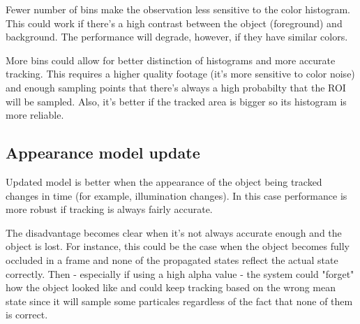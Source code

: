 \documentclass[10pt,a4paper,twoside]{article}
\begin{document}
Fewer number of bins make the observation less sensitive to the color histogram.
This could work if there's a high contrast between the object (foreground) and
background. The performance will degrade, however, if they have similar colors.

More bins could allow for better distinction of histograms and more accurate tracking. This requires a
higher quality footage (it's more sensitive to color noise) and enough sampling
points that there's always a high probabilty that the ROI will be sampled. Also,
it's better if the tracked area is bigger so its histogram is more reliable.

\subsection{Appearance model update}
Updated model is better when the appearance of the object being tracked changes
in time (for example, illumination changes). In this case performance is more
robust if tracking is always fairly accurate.

The disadvantage becomes clear when it's not always accurate enough and the object is
lost. For instance, this could be the case when the object becomes fully
occluded in a frame and
none of the propagated states reflect the actual state correctly. Then
- especially if using a high alpha value - the system could "forget" how the object looked
like and could keep tracking based on the wrong mean state since it will sample
some particales regardless of the fact that none of them is correct.



\end{document}
